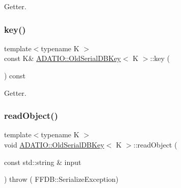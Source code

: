 Getter. 

\mbox{\label{classADATIO_1_1OldSerialDBKey_a10d8c5351439c43bacb5e365750e7b1d}} 
\subsubsection{\texorpdfstring{key()}{key()}\hspace{0.1cm}{\footnotesize\ttfamily [4/4]}}
{\footnotesize\ttfamily template$<$typename K $>$ \\
const K\& \mbox{\hyperlink{classADATIO_1_1OldSerialDBKey}{A\+D\+A\+T\+I\+O\+::\+Old\+Serial\+D\+B\+Key}}$<$ K $>$\+::key (\begin{DoxyParamCaption}{ }\end{DoxyParamCaption}) const\hspace{0.3cm}{\ttfamily [inline]}}



Getter. 

\mbox{\label{classADATIO_1_1OldSerialDBKey_a4d79b5e8834dc154ddc981e153924ccd}} 
\subsubsection{\texorpdfstring{readObject()}{readObject()}\hspace{0.1cm}{\footnotesize\ttfamily [1/2]}}
{\footnotesize\ttfamily template$<$typename K $>$ \\
void \mbox{\hyperlink{classADATIO_1_1OldSerialDBKey}{A\+D\+A\+T\+I\+O\+::\+Old\+Serial\+D\+B\+Key}}$<$ K $>$\+::read\+Object (\begin{DoxyParamCaption}\item[{const std\+::string \&}]{input }\end{DoxyParamCaption}) throw ( F\+F\+D\+B\+::\+Serialize\+Exception) \hspace{0.3cm}{\ttfamily [inline]}}

